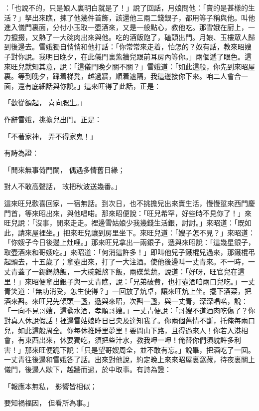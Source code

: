 \begin{showcontents}{}
：「也說不的，只是娘人裏明白就是了！」說了回話，月娘問他：「賣的是甚樣的生活？」拏出來瞧，揀了他幾件首飾，該還他三兩二錢銀子，都用等子稱與他。叫他進入儀門裏面，分付小玉取一壺酒來，又是一般點心，教他吃。那雪娥在廚上，一力攛掇，又熱了一大碗肉出來與他。吃的酒飯飽了，磕頭出門。月娘、玉樓眾人歸到後邊去。雪娥獨自悄悄和他打話：「你常常來走着，怕怎的？奴有話，教來昭嫂子對你說。我明日晚夕，在此儀門裏紫牆兒跟前耳房內等你。」兩個遞了眼色。這來旺兒就知其意，說：「這儀門晚夕關不關？」雪娥道：「如此這般，你先到來昭屋裏。等到晚夕，踩着梯凳，越過牆，順着遮隔，我這邊接你下來。咱二人會合一面，還有底細話與你說。」這來旺得了此話，正是：

「歡從額起，  喜向腮生。」

作辭雪娥，挑擔兒出門。正是：

「不著家神，  弄不得家鬼！」

有詩為證：

「閒來無事倚門闌，  偶遇多情舊日緣；

對人不敢高聲話，  故把秋波送幾番。」

這來旺兒歡喜回家，一宿無話。到次日，也不挑擔兒出來賣生活，慢慢踅來西門慶門首，等來昭出來，與他唱喏。那來昭便說：「旺兒希罕，好些時不見你了！」來旺兒說：「沒事，閒來走走。裡邊雪姑娘少我幾錢生活銀，討討。」來昭道：「既如此，請來屋裡坐。」把來旺兒讓到房里坐下。來旺兒道：「嫂子怎不見？」來昭道：「你嫂子今日後邊上灶哩。」那來旺兒拿出一兩銀子，遞與來昭說：「這幾星銀子，取壺酒來和哥嫂吃。」來昭道：「何消這許多！」即叫他兒子鐵棍兒過來，那鐵棍弔起頭去，十五歲了；拿壺出來，打了一大注酒。使他後邊叫一丈青來。不一時，一丈青蓋了一錫鍋熱飯，一大碗雜熬下飯，兩碟菜蔬，說道：「好呀，旺官兒在這里！」來昭便拿出銀子與一丈青瞧，說：「兄弟破費，也打壺酒咱兩口兒吃。」一丈青笑道：「無功消受，怎生使得？」一回放了炕卓，讓來旺炕上坐。擺下酒菜，把酒來斟。來旺兒先傾頭一盞，遞與來昭，次斟一盞，與一丈青，深深唱喏，說：「一向不見哥嫂，這盞水酒，孝順哥嫂。」一丈青便說：「哥嫂不道酒肉吃傷了？你對真人休說假話！裡邊雪姑娘昨日已央及達知我了。你兩個舊情不斷，托俺每兩口兒，如此這般周全。你每休推睡里夢里！要問山下路，且得過來人！你若入港相會，有東西出來，休要獨吃，須把些汁水，教我呷一呷！俺替你們須躭許多利害！」那來旺便跪下說：「只是望哥嫂周全，並不敢有忘。」說畢，把酒吃了一回。一丈青往後邊和雪娥答了話。出來對他說，約定晚上來來昭屋裏窩藏，待夜裏關上儀門，後邊人歇下，越牆而過，於中取事。有詩為證：

「報應本無私，  影響皆相似；

要知禍福因，  但看所為事。」


\end{showcontents}
